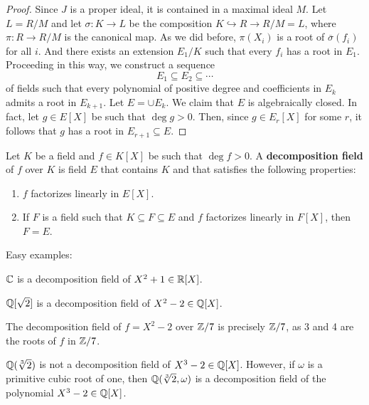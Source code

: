 \begin{proof}
    Since $J$ is a proper ideal, it is contained in a maximal ideal $M$. Let $L=R/M$ 
    and let $\sigma\colon K\to L$ be the composition $K\hookrightarrow R\to R/M=L$, 
    where $\pi\colon R\to R/M$ is the canonical map.  
    As we did before,
    $\pi(X_i)$ is a root of $\overline{\sigma}(f_i)$ for all $i$. And 
    there exists an extension $E_1/K$ such that
    every $f_i$ has a root in $E_1$. Proceeding in this way, we construct
    a sequence
    \[
    E_1\subseteq E_2\subseteq\cdots
    \]
    of fields such that every polynomial of positive degree and coefficients in $E_k$ 
    admits a root in $E_{k+1}$. Let $E=\cup E_k$. We claim that $E$ is algebraically closed. In fact, 
    let $g\in E[X]$ be such that $\deg g>0$. Then, since $g\in E_r[X]$ for some $r$, it follows
    that $g$ has a root in $E_{r+1}\subseteq E$. 
\end{proof}


\begin{definition}
	Let $K$ be a field and $f\in K[X]$ be such that $\deg f>0$. A \textbf{decomposition field}
	of $f$ over $K$ is field $E$ that contains $K$ and that satisfies the following properties:
	\begin{enumerate}
		\item $f$ factorizes linearly in $E[X]$. 
		\item If $F$ is a field such that $K\subseteq F\subseteq E$ and 
			$f$ factorizes
			linearly in $F[X]$, then $F=E$. 
	\end{enumerate}
\end{definition}

Easy examples: 

\begin{example}
	$\mathbb{C}$ is a decomposition field of $X^2+1\in\mathbb{R}[X]$. 
\end{example}

\begin{example}
	$\mathbb{Q}[\sqrt{2}]$ is a decomposition field of $X^2-2\in\mathbb{Q}[X]$. 
\end{example}

\begin{example}
    The decomposition field of $f=X^2-2$ over $\mathbb{Z}/7$ is 
    precisely $\mathbb{Z}/7$, as 3 and 4 are the roots of $f$ in $\mathbb{Z}/7$. 
\end{example}

\begin{example}
	$\mathbb{Q}(\sqrt[3]{2})$ is not a decomposition field of $X^3-2\in\mathbb{Q}[X]$. However, if
	$\omega$ is a primitive cubic root of one, then 
	$\mathbb{Q}(\sqrt[3]{2},\omega)$ is a decomposition field of the polynomial $X^3-2\in\mathbb{Q}[X]$. 
\end{example}

